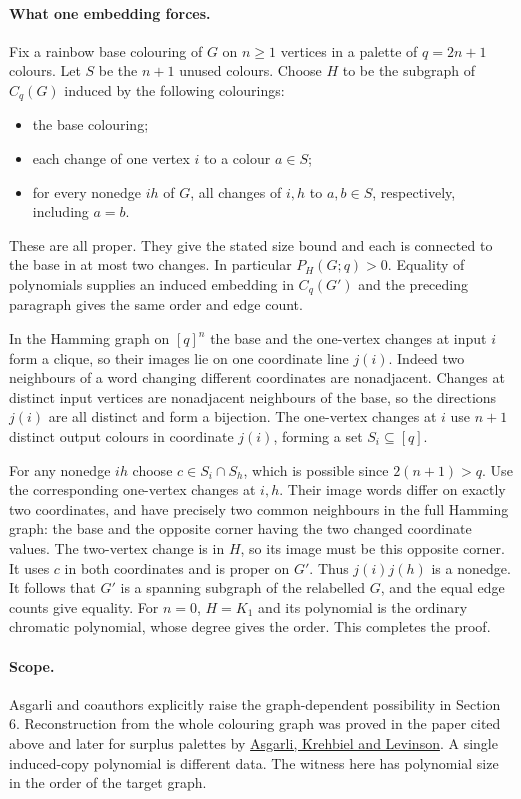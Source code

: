 \documentclass[11pt]{article}
\begin{document}
\paragraph{What one embedding forces.} Fix a rainbow base colouring of $G$ on $n\ge1$ vertices in a palette of $q=2n+1$ colours. Let $S$ be the $n+1$ unused colours. Choose $H$ to be the subgraph of $C_q(G)$ induced by the following colourings:
\begin{itemize}
\item the base colouring;
\item each change of one vertex $i$ to a colour $a\in S$;
\item for every nonedge $ih$ of $G$, all changes of $i,h$ to $a,b\in S$, respectively, including $a=b$.
\end{itemize}
These are all proper. They give the stated size bound and each is connected to the base in at most two changes. In particular $P_H(G;q)>0$. Equality of polynomials supplies an induced embedding in $C_q(G')$ and the preceding paragraph gives the same order and edge count.

In the Hamming graph on $[q]^n$ the base and the one-vertex changes at input $i$ form a clique, so their images lie on one coordinate line $j(i)$. Indeed two neighbours of a word changing different coordinates are nonadjacent. Changes at distinct input vertices are nonadjacent neighbours of the base, so the directions $j(i)$ are all distinct and form a bijection. The one-vertex changes at $i$ use $n+1$ distinct output colours in coordinate $j(i)$, forming a set $S_i\subseteq[q]$.

For any nonedge $ih$ choose $c\in S_i\cap S_h$, which is possible since $2(n+1)>q$. Use the corresponding one-vertex changes at $i,h$. Their image words differ on exactly two coordinates, and have precisely two common neighbours in the full Hamming graph: the base and the opposite corner having the two changed coordinate values. The two-vertex change is in $H$, so its image must be this opposite corner. It uses $c$ in both coordinates and is proper on $G'$. Thus $j(i)j(h)$ is a nonedge. It follows that $G'$ is a spanning subgraph of the relabelled $G$, and the equal edge counts give equality. For $n=0$, $H=K_1$ and its polynomial is the ordinary chromatic polynomial, whose degree gives the order. This completes the proof.
\paragraph{Scope.} Asgarli and coauthors explicitly raise the graph-dependent possibility in Section 6. Reconstruction from the whole colouring graph was proved in the paper cited above and later for surplus palettes by \href{https://arxiv.org/abs/2504.20978}{Asgarli, Krehbiel and Levinson}. A single induced-copy polynomial is different data. The witness here has polynomial size in the order of the target graph.
\end{document}
